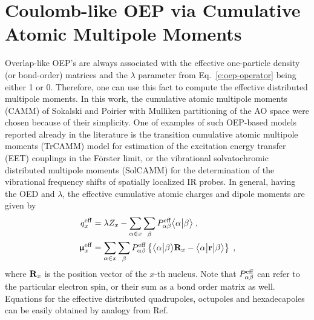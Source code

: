 \section{Coulomb-like OEP via Cumulative Atomic Multipole Moments\label{a:oep-camm}}

Overlap\hyp{}like OEP's are always associated with the effective one\hyp{}particle density
(or bond\hyp{}order) 
matrices and the $\lambda$ parameter from Eq.~\eqref{e:oep-operator} being either 1 or 0. 
Therefore, one can use this fact to compute the effective distributed multipole
moments. In this work, the cumulative atomic multipole moments (CAMM)
of Sokalski and Poirier with Mulliken partitioning of the AO space
were chosen because of their simplicity.
One of examples
of such OEP\hyp{}based models reported already in the literature is
the transition cumulative atomic multipole moments (TrCAMM) model
for estimation of the excitation energy transfer (EET) couplings in the F{\"o}rster
limit\cite{Blasiak.Maj.Cho.Gora.JCTC.2015}, 
or the vibrational solvatochromic distributed multipole moments
(SolCAMM) for the determination of the vibrational frequency shifts
of spatially localized IR probes.\cite{Blasiak.Lee.Cho.JCP.2013}
In general, having the OED and $\lambda$, the effective cumulative atomic charges
and dipole moments are given by
%
\begin{subequations} \label{e:a1-v.oep-camm}
 \begin{align}
  q_x^{\rm eff} &= \lambda Z_x - 
       \sum_{\alpha\in x}\sum_{\beta} 
        P_{\alpha\beta}^{\rm eff} \bigl\langle {\alpha} \bigl\lvert {\beta} \bigr\rangle \;, \\
  {\bm{\upmu}}_x^{\rm eff} &= 
       \sum_{\alpha\in x}\sum_{\beta} 
        P_{\alpha\beta}^{\rm eff}
   \left\{ 
    \bigl\langle {\alpha} \bigl\lvert {\beta} \bigr\rangle {\bf R}_x - \bigl\langle {\alpha} \bigl\lvert {\bf r} \bigl\lvert {\beta} \bigr\rangle 
   \right\}
   \;,
 \end{align}
\end{subequations}
%
where ${\bf R}_x$ is the position vector of the $x$-th nucleus.
Note that $P_{\alpha\beta}^{\rm eff}$ can refer to the particular electron
spin, or their sum as a bond order matrix as well.
Equations for the effective distributed quadrupoles, octupoles and hexadecapoles
can be easily obtained by analogy from Ref.~\cite{Blasiak.Maj.Cho.Gora.JCTC.2015}


